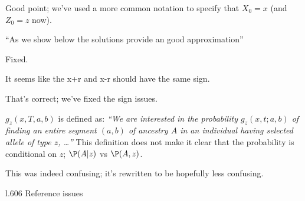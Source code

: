 \reply
Good point; we've used a more common notation to specify that $X_0=x$ (and $Z_0=z$ now).

\begin{point}{} 
``As we show below the solutions provide an good approximation''
\end{point}

\reply
Fixed.

\begin{point}{\revref}
It seems like the x+r and x-r should have the same sign.
\end{point}

\reply
That's correct; we've fixed the sign issues.

\begin{point}{\revref}
$g_z(x, T, a,b)$ is defined as: \textit{``We are interested in the probability $g_z(x, t; a, b)$ of finding an entire segment $(a, b)$ of ancestry $A$ in an individual having selected allele of type $z$, \ldots ''}
This definition does not make it clear that the probability is conditional on $z$; $\P(A|z)$ vs $\P(A,z)$.
\end{point}

\reply
This was indeed confusing; it's rewritten to be hopefully less confusing.

\begin{point}{l.606}
Reference issues
\end{point}

\reply
{}



% 
% 
% 
% 



